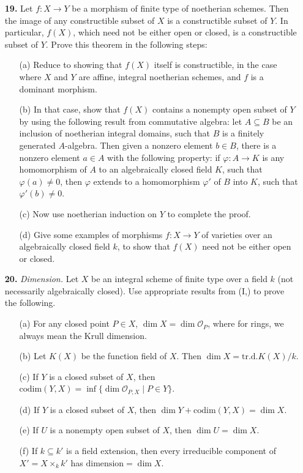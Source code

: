 \documentclass{article}
\newcommand{\OO}{\mathscr{O}}
\begin{document}
\begin{enumerate} [label=\textbf{\arabic*.}, leftmargin=0em]
\item[\textbf{19.}] Let $f : X \to Y$ be a morphism of finite type of noetherian schemes. Then the image of any constructible subset of $X$ is a constructible subset of $Y$. In particular, $f(X)$, which need not be either open or closed, is a constructible subset of $Y$. Prove this theorem in the following steps:
\begin{itemize} [leftmargin=0cm]
    \item[(a)] Reduce to showing that $f(X)$ itself is constructible, in the case where $X$ and $Y$ are affine, integral noetherian schemes, and $f$ is a dominant morphism.
    \item[(b)] In that case, show that $f(X)$ contains a nonempty open subset of $Y$ by using the following result from commutative algebra: let $A \subseteq B$ be an inclusion of noetherian integral domains, such that $B$ is a finitely generated $A$-algebra. Then given a nonzero element $b \in B$, there is a nonzero element $a \in A$ with the following property: if $\varphi : A \to K$ is any homomorphism of $A$ to an algebraically closed field $K$, such that $\varphi(a) \neq 0$, then $\varphi$ extends to a homomorphism $\varphi'$ of $B$ into $K$, such that $\varphi'(b) \neq 0$.
    \item[(c)] Now use noetherian induction on $Y$ to complete the proof.
    \item[(d)] Give some examples of morphisms $f : X \to Y$ of varieties over an algebraically closed field $k$, to show that $f(X)$ need not be either open or closed.
\end{itemize}

\item[\textbf{20.}] \textit{Dimension.} Let $X$ be an integral scheme of finite type over a field $k$ (not necessarily algebraically closed). Use appropriate results from (I,) to prove the following.
\begin{itemize} [leftmargin=0cm]
    \item[(a)] For any closed point $P \in X$, $\dim{X} = \dim{\OO_P}$, where for rings, we always mean the Krull dimension.
    \item[(b)] Let $K(X)$ be the function field of $X$. Then $\dim{X} = \text{tr.d.} K(X) / k$.
    \item[(c)] If $Y$ is a closed subset of $X$, then $\text{codim}(Y, X) = \inf\{\dim{\OO_{P, X}} \mid P \in Y\}$.
    \item[(d)] If $Y$ is a closed subset of $X$, then $\dim{Y} + \text{codim}(Y, X) = \dim{X}$.
    \item[(e)] If $U$ is a nonempty open subset of $X$, then $\dim{U} = \dim{X}$.
    \item[(f)] If $k \subseteq k'$ is a field extension, then every irreducible component of $X' = X \times_k k'$ has $\text{dimension} = \dim{X}$.
\end{itemize}


\end{enumerate}
\end{document}

